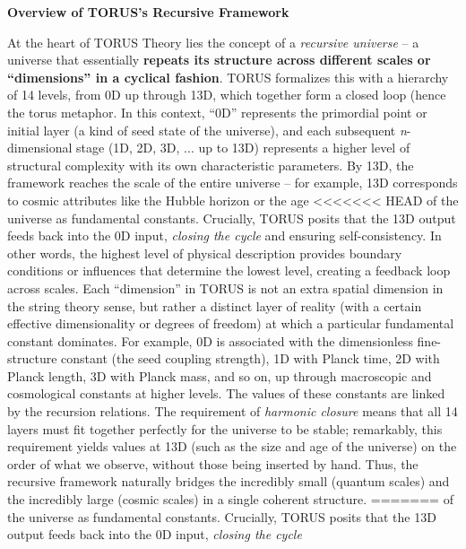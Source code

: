 \documentclass[]{article}
\begin{document}
\textbf{Overview of TORUS's Recursive Framework}

At the heart of TORUS Theory lies the concept of a \emph{recursive
universe} -- a universe that essentially \textbf{repeats its structure
across different scales or ``dimensions'' in a cyclical fashion}. TORUS
formalizes this with a hierarchy of 14 levels, from 0D up through 13D,
which together form a closed loop (hence the torus metaphor. In this
context, ``0D'' represents the primordial point or initial layer (a kind
of seed state of the universe), and each subsequent \emph{n}-dimensional
stage (1D, 2D, 3D, ... up to 13D) represents a higher level of
structural complexity with its own characteristic parameters. By 13D,
the framework reaches the scale of the entire universe -- for example,
13D corresponds to cosmic attributes like the Hubble horizon or the age
<<<<<<< HEAD
of the universe as fundamental constants\hspace{0pt}. Crucially, TORUS
posits that the 13D output feeds back into the 0D input, \emph{closing
the cycle} and ensuring self-consistency\hspace{0pt}. In other words,
the highest level of physical description provides boundary conditions
or influences that determine the lowest level, creating a feedback loop
across scales. Each ``dimension'' in TORUS is not an extra spatial
dimension in the string theory sense, but rather a distinct layer of
reality (with a certain effective dimensionality or degrees of freedom)
at which a particular fundamental constant dominates. For example, 0D is
associated with the dimensionless fine-structure constant \alpha (the seed
coupling strength), 1D with Planck time, 2D with Planck length, 3D with
Planck mass, and so on, up through macroscopic and cosmological
constants at higher levels\hspace{0pt}. The values of these constants
are linked by the recursion relations. The requirement of \emph{harmonic
closure} means that all 14 layers must fit together perfectly for the
universe to be stable; remarkably, this requirement yields values at 13D
(such as the size and age of the universe) on the order of what we
observe, without those being inserted by hand\hspace{0pt}. Thus, the
recursive framework naturally bridges the incredibly small (quantum
scales) and the incredibly large (cosmic scales) in a single coherent
structure.
=======
of the universe as fundamental constants​. Crucially, TORUS posits that
the 13D output feeds back into the 0D input, \emph{closing the cycle}
\end{document}
